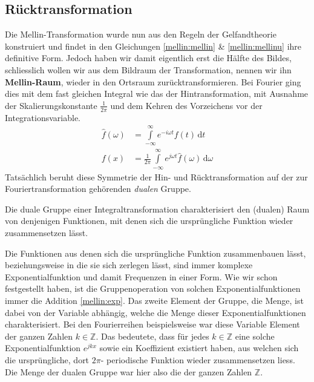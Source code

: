 \subsection{Rücktransformation
\label{mellin:subsection:ruecktransformation}}
Die Mellin-Transformation wurde nun aus den Regeln der Gelfandtheorie konstruiert und findet in den Gleichungen 
\eqref{mellin:mellin} \& \eqref{mellin:mellinu} ihre definitive Form.
Jedoch haben wir damit eigentlich erst die Hälfte des Bildes, schliesslich wollen wir aus dem Bildraum der Transformation, 
nennen wir ihn \textbf{Mellin-Raum}, wieder in den Ortsraum zurücktransformieren. 
Bei Fourier ging dies mit dem fast gleichen Integral wie das der Hintransformation, mit Ausnahme der Skalierungskonstante $\frac{1}{2\pi}$
und dem Kehren des Vorzeichens vor der Integrationsvariable.
\[
\begin{aligned}
    \hat{f}(\omega) &= \int\limits_{-\infty}^{\infty} e^{-i\omega{}t} f(t) \,\mathrm{d}t \\
    f(x) &= \frac{1}{2\pi} \int\limits_{-\infty}^{\infty} e^{j\omega t} \hat{f}(\omega) \,\mathrm{d}\omega
\end{aligned}
\]
Tatsächlich beruht diese Symmetrie der Hin- und Rücktransformation auf der zur Fouriertransformation gehörenden \emph{dualen} Gruppe.
\begin{definition}
    Die duale Gruppe einer Integraltransformation charakterisiert den (dualen) Raum von denjenigen Funktionen, mit denen sich die ursprüngliche 
    Funktion wieder zusammensetzen lässt.
\end{definition}
Die Funktionen aus denen sich die ursprüngliche Funktion zusammenbauen lässt, beziehungsweise in die sie sich zerlegen lässt, 
sind immer komplexe Exponentialfunktion und damit Frequenzen in einer Form. 
Wie wir schon festgestellt haben, ist die Gruppenoperation von solchen Exponentialfunktionen immer die Addition \eqref{mellin:exp}.
Das zweite Element der Gruppe, die Menge, ist dabei von der Variable abhängig, welche die Menge dieser Exponentialfunktionen charakterisiert.
Bei den Fourierreihen beispielsweise war diese Variable Element der ganzen Zahlen $k \in \mathbb{Z}$.
Das bedeutete, dass für jedes $k \in \mathbb{Z}$ eine solche Exponentialfunktion $e^{jkx}$ sowie ein Koeffizient existiert haben, 
aus welchen sich die ursprüngliche, dort $2\pi$- periodische Funktion wieder zusammensetzen liess.
Die Menge der dualen Gruppe war hier also die der ganzen Zahlen $\mathbb{Z}$. 
